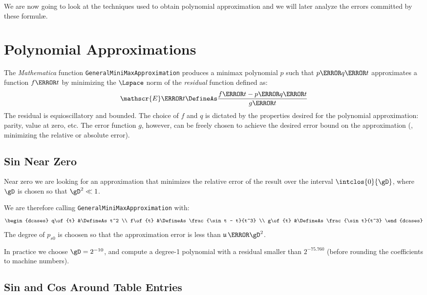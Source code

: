 \documentclass[10pt, a4paper, twoside]{basestyle}
\DeclareMathOperator{\ULP}{\mathfrak u}
\begin{document}
We are now going to look at the techniques used to obtain polynomial approximation and we will later analyze the errors committed by these formulæ.

\section*{Polynomial Approximations}

The \textit{Mathematica} function \texttt{GeneralMiniMaxApproximation} produces a minimax polynomial $p$ such that $p\of{q\of{t}}$ approximates a function $f\of{t}$ by minimizing the $\Lspace$ norm of the \emph{residual} function defined as:
\[
\mathscr{E}\of{t} \DefineAs \frac{f\of{t} - p\of{q\of{t}}}{g\of{t}}
\]
The residual is equioscillatory and bounded.  The choice of $f$ and $q$ is dictated by the properties desired for the polynomial approximation: parity, value at zero, etc.  The error function $g$, however, can be freely chosen to achieve the desired error bound on the approximation (\exempligratia, minimizing the relative or absolute error).

\subsection*{Sin Near Zero}

Near zero we are looking for an approximation that minimizes the relative error of the result over the interval $\intclos{0}{\gD}$, where $\gD$ is chosen so that $\gD^2 \ll 1$.

We are therefore calling \texttt{GeneralMiniMaxApproximation} with:
\[
\begin{dcases}
q\of{t} &\DefineAs t^2 \\
f\of{t} &\DefineAs \frac{\sin t - t}{t^3} \\
g\of{t} &\DefineAs \frac{\sin t}{t^3}
\end{dcases}
\]
The degree of $p_{s0}$ is choosen so that the approximation error is less than $\ULP\of{\gD^2}$.

In practice we choose $\gD = 2^{-10}$, and compute a degree-1 polynomial with a residual smaller than $2^{-75.760}$ (before rounding the coefficients to machine numbers).

\subsection*{Sin and Cos Around Table Entries}
\end{document}
